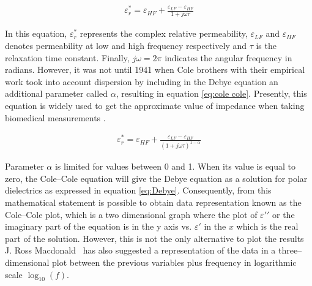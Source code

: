 \begin{align}
	\label{eq:Debye}
	\varepsilon_r^* = \varepsilon_{HF} + \frac{\varepsilon_{LF} - \varepsilon_{HF}}{1 + j \omega \tau}
\end{align}

In this equation, $\varepsilon_r^*$ represents the complex relative permeability, $\varepsilon_{LF}$ and $\varepsilon_{HF}$ denotes permeability at low and high frequency respectively and $\tau$ is the relaxation time constant. Finally, $j \omega =2 \pi$ indicates the angular frequency in radians. However, it was not until 1941 when Cole brothers with their empirical work took into account dispersion by including in the Debye equation an additional parameter called $\alpha$, resulting in equation \ref{eq:cole cole}. Presently, this equation is widely used to get the approximate value of impedance when taking biomedical measurements \cite{cole1941dispersion}.

\begin{align}
	\label{eq:cole cole}
	\varepsilon_r^* = \varepsilon_{HF} + \frac{\varepsilon_{LF} - \varepsilon_{HF}}{(1 + j \omega \tau)^{1-\alpha}}
\end{align}

Parameter $\alpha$ is limited for values between 0 and 1. When its value is equal to zero, the Cole–Cole equation will give the Debye equation as a solution for polar dielectrics as expressed in equation \ref{eq:Debye}. Consequently, from this mathematical statement is possible to obtain data representation known as the Cole–Cole plot, which is a two dimensional graph where the plot of $\varepsilon \prime\prime$ or the imaginary part of the equation is in the y axis vs. $\varepsilon \prime$ in the $x$ which is the real part of the solution. However, this is not the only alternative to plot the results J. Ross Macdonald~\cite{macdonald2005impedance, macdonald1992impedance} has also suggested a representation of the data in a three–dimensional plot between the previous variables plus frequency in logarithmic scale $\log_{10}(f)$.


